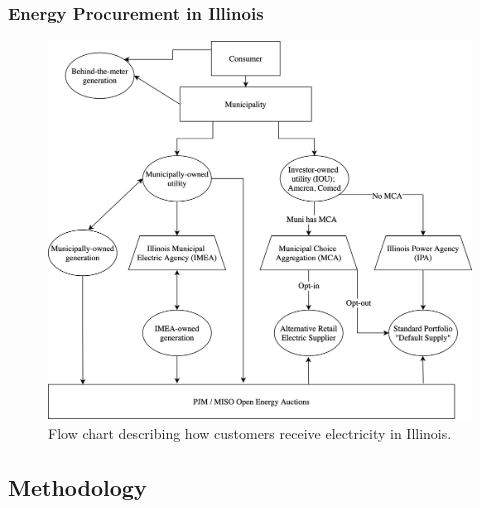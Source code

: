 \begin{frame}
    \frametitle{Energy Procurement in Illinois}
    \begin{figure}
        \centering
        \includegraphics[height=0.8\textheight]{../docs/figures/07_interview_chapter/illinois-electric-choice.png}
        \caption{Flow chart describing how customers receive electricity in Illinois.}
        \label{fig:illinois-flow-chart}
    \end{figure}
\end{frame}

\subsection{Methodology}

